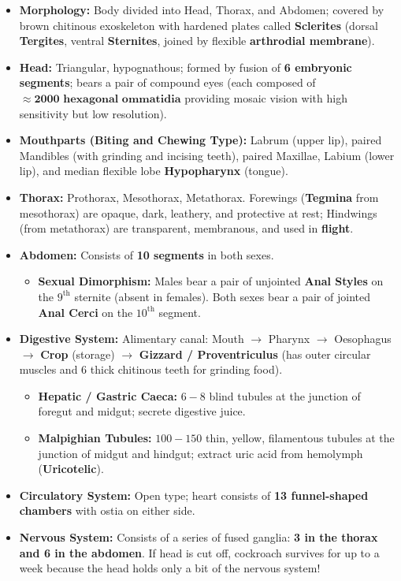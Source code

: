 \documentclass[10pt,a4paper]{article}
\begin{document}
\begin{conceptbox}
\begin{itemize}
  \item \textbf{Morphology:} Body divided into Head, Thorax, and Abdomen; covered by brown chitinous exoskeleton with hardened plates called \textbf{Sclerites} (dorsal \textbf{Tergites}, ventral \textbf{Sternites}, joined by flexible \textbf{arthrodial membrane}).
  \item \textbf{Head:} Triangular, hypognathous; formed by fusion of \textbf{6 embryonic segments}; bears a pair of compound eyes (each composed of $\approx \mathbf{2000\text{ hexagonal ommatidia}}$ providing mosaic vision with high sensitivity but low resolution).
  \item \textbf{Mouthparts (Biting and Chewing Type):} Labrum (upper lip), paired Mandibles (with grinding and incising teeth), paired Maxillae, Labium (lower lip), and median flexible lobe \textbf{Hypopharynx} (tongue).
  \item \textbf{Thorax:} Prothorax, Mesothorax, Metathorax. Forewings (\textbf{Tegmina} from mesothorax) are opaque, dark, leathery, and protective at rest; Hindwings (from metathorax) are transparent, membranous, and used in \textbf{flight}.
  \item \textbf{Abdomen:} Consists of \textbf{10 segments} in both sexes.
  \begin{itemize}
    \item \textbf{Sexual Dimorphism:} Males bear a pair of unjointed \textbf{Anal Styles} on the $9^{\mathrm{th}}$ sternite (absent in females). Both sexes bear a pair of jointed \textbf{Anal Cerci} on the $10^{\mathrm{th}}$ segment.
  \end{itemize}
  \item \textbf{Digestive System:} Alimentary canal: Mouth $\to$ Pharynx $\to$ Oesophagus $\to$ \textbf{Crop} (storage) $\to$ \textbf{Gizzard / Proventriculus} (has outer circular muscles and 6 thick chitinous teeth for grinding food).
  \begin{itemize}
    \item \textbf{Hepatic / Gastric Caeca:} $6-8$ blind tubules at the junction of foregut and midgut; secrete digestive juice.
    \item \textbf{Malpighian Tubules:} $100-150$ thin, yellow, filamentous tubules at the junction of midgut and hindgut; extract uric acid from hemolymph (\textbf{Uricotelic}).
  \end{itemize}
  \item \textbf{Circulatory System:} Open type; heart consists of \textbf{13 funnel-shaped chambers} with ostia on either side.
  \item \textbf{Nervous System:} Consists of a series of fused ganglia: \textbf{3 in the thorax and 6 in the abdomen}. If head is cut off, cockroach survives for up to a week because the head holds only a bit of the nervous system!
\end{itemize}
\end{conceptbox}
\end{document}
